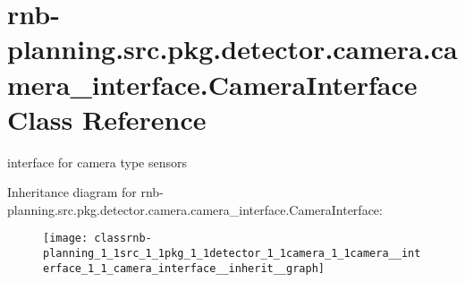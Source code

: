 \hypertarget{classrnb-planning_1_1src_1_1pkg_1_1detector_1_1camera_1_1camera__interface_1_1_camera_interface}{}\section{rnb-\/planning.src.\+pkg.\+detector.\+camera.\+camera\+\_\+interface.\+Camera\+Interface Class Reference}
\label{classrnb-planning_1_1src_1_1pkg_1_1detector_1_1camera_1_1camera__interface_1_1_camera_interface}


interface for camera type sensors  




Inheritance diagram for rnb-\/planning.src.\+pkg.\+detector.\+camera.\+camera\+\_\+interface.\+Camera\+Interface\+:
\nopagebreak
\begin{figure}[H]
\begin{center}
\leavevmode
\texttt{[image: classrnb-planning\_1\_1src\_1\_1pkg\_1\_1detector\_1\_1camera\_1\_1camera\_\_interface\_1\_1\_camera\_interface\_\_inherit\_\_graph]}
\end{center}
\end{figure}
